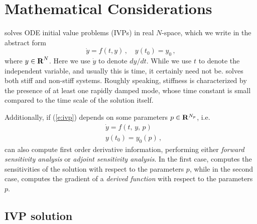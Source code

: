 \chapter{Mathematical Considerations}\label{s:math}

{\cvodes} solves ODE initial value problems (IVPs) in real $N$-space, which we
write in the abstract form
\begin{equation}\label{e:ivp} 
  \dot{y} = f(t,y) \, ,\quad y(t_0) = y_0 \, ,
\end{equation}
where $y \in \mbox{\bf R}^N$.
Here we use $\dot{y}$ to denote $dy/dt$.  While we use $t$ to denote
the independent variable, and usually this is time, it certainly need
not be.  {\cvodes} solves both stiff and non-stiff systems.  Roughly
speaking, stiffness is characterized by the presence of at least one
rapidly damped mode, whose time constant is small compared to the time
scale of the solution itself.

Additionally, if (\ref{e:ivp}) depends on some parameters $p \in {\bf R}^{N_p}$,
i.e.
\begin{equation}\label{e:ivp_p}
\begin{split}
&{\dot{y}}  = f(t,\,y,\,p) \\
&y(t_0)  = y_0(p) \, ,
\end{split}
\end{equation}
{\cvodes} can also compute first order derivative information, performing either
{\em forward sensitivity analysis} or {\em adjoint sensitivity analysis}.
In the first case, {\cvodes} computes the sensitivities of the
solution with respect to the parameters $p$, while in the second case,
{\cvodes} computes the gradient of a {\em derived function} with
respect to the parameters $p$.

\section{IVP solution}\label{ss:ivp_sol}

